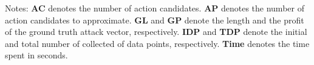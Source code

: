 
\newcommand{\tnote}[1]{$^{\mathrm{#1}}$}

\begin{table}[]
    \caption{Summary of {\name} results. }
    \vspace{-2mm}
    \label{tab:RQ1}
    \centering


    \flushleft
    {\raggedright Notes: 
    \textbf{AC} denotes the number of action candidates.  
    \textbf{AP} denotes the number of action candidates to approximate. 
    \textbf{GL} and \textbf{GP} denote the length and the profit of the ground truth attack vector, respectively. 
    \textbf{IDP} and \textbf{TDP} denote the initial and total number of collected of data points, respectively.
    \textbf{Time} denotes the time spent in seconds.
    \par}


\end{table}
